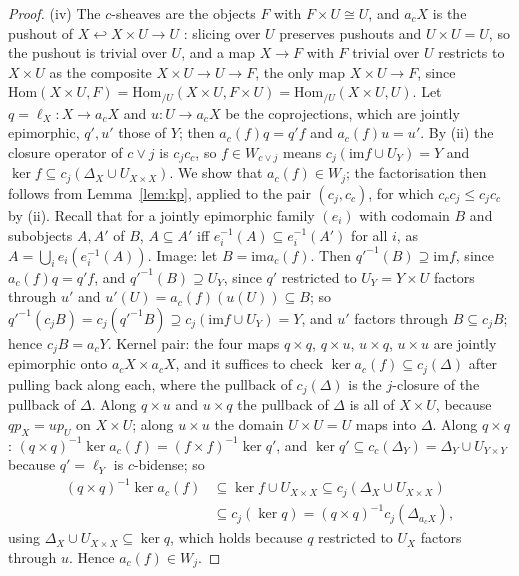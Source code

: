 \documentclass[11pt]{amsart}
\theoremstyle{definition}
\newcommand{\Hom}{\mathrm{Hom}}
\newcommand{\im}{\mathrm{im}}
\begin{document}
\begin{proof}
(iv) The $c$-sheaves are the objects $F$ with $F\times U\cong U$, and
$a_cX$ is the pushout of $X\hookleftarrow X\times U\to U$ \cite[A4.5]
{Elephant}: slicing over $U$ preserves pushouts and $U\times U=U$, so the
pushout is trivial over $U$, and a map $X\to F$ with $F$ trivial over $U$
restricts to $X\times U$ as the composite $X\times U\to U\to F$, the only
map $X\times U\to F$, since $\Hom(X\times U,F)=\Hom_{/U}(X\times U,F\times
U)=\Hom_{/U}(X\times U,U)$. Let $q=\ell_X\colon X\to a_cX$ and $u\colon U\to
a_cX$ be the coprojections, which are jointly epimorphic, $q',u'$ those of
$Y$; then $a_c(f)q=q'f$ and $a_c(f)u=u'$. By (ii) the closure operator of
$c\vee j$ is $c_jc_c$, so $f\in W_{c\vee j}$ means $c_j(\im f\cup U_Y)=Y$
and $\ker f\subseteq c_j(\Delta_X\cup U_{X\times X})$. We show that
$a_c(f)\in W_j$; the factorisation then follows from Lemma~\ref{lem:kp},
applied to the pair $(c_j,c_c)$, for which $c_cc_j\le c_jc_c$ by (ii).
Recall that for a jointly epimorphic family $(e_i)$ with
codomain $B$ and subobjects $A,A'$ of $B$, $A\subseteq A'$ iff
$e_i^{-1}(A)\subseteq e_i^{-1}(A')$ for all $i$, as $A=\bigcup_ie_i
(e_i^{-1}(A))$. Image: let $B=\im a_c(f)$. Then $q'^{-1}(B)\supseteq\im f$,
since $a_c(f)q=q'f$, and $q'^{-1}(B)\supseteq U_Y$, since $q'$ restricted to
$U_Y=Y\times U$ factors through $u'$ and $u'(U)=a_c(f)(u(U))\subseteq B$;
so $q'^{-1}(c_jB)=c_j(q'^{-1}B)\supseteq c_j(\im f\cup U_Y)=Y$, and $u'$
factors through $B\subseteq c_jB$; hence $c_jB=a_cY$. Kernel pair: the four
maps $q\times q$, $q\times u$, $u\times q$, $u\times u$ are jointly
epimorphic onto $a_cX\times a_cX$, and it suffices to check $\ker a_c(f)
\subseteq c_j(\Delta)$ after pulling back along each, where the pullback
of $c_j(\Delta)$ is the $j$-closure of the pullback of $\Delta$. Along
$q\times u$ and $u\times q$ the pullback of $\Delta$ is all of $X\times U$,
because $qp_X=up_U$ on $X\times U$; along $u\times u$ the domain $U\times
U=U$ maps into $\Delta$. Along $q\times q$: $(q\times q)^{-1}\ker a_c(f)=
(f\times f)^{-1}\ker q'$, and $\ker q'\subseteq c_c(\Delta_Y)=\Delta_Y\cup
U_{Y\times Y}$ because $q'=\ell_Y$ is $c$-bidense; so
\begin{align*}
(q\times q)^{-1}\ker a_c(f)&\subseteq\ker f\cup U_{X\times X}\subseteq
c_j(\Delta_X\cup U_{X\times X})\\
&\subseteq c_j(\ker q)=(q\times q)^{-1}c_j(\Delta_{a_cX}),
\end{align*}
using $\Delta_X\cup U_{X\times X}\subseteq\ker q$, which holds because $q$
restricted to $U_X$ factors through $u$. Hence $a_c(f)\in W_j$.


\end{proof}
\end{document}
